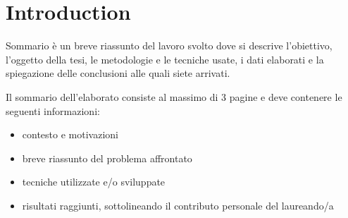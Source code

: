 \documentclass[epsfig,a4paper,11pt,titlepage,twoside,openany]{book}
\begin{document}
      



\chapter{Introduction}
\label{chap:introduction}

Sommario è un breve riassunto del lavoro svolto dove si descrive l'obiettivo,
l'oggetto della tesi, le metodologie e le tecniche usate, i dati elaborati e la
spiegazione delle conclusioni alle quali siete arrivati.

Il sommario dell’elaborato consiste al massimo di 3 pagine e deve contenere le
seguenti informazioni:

\begin{itemize}
\item contesto e motivazioni
\item breve riassunto del problema affrontato
\item tecniche utilizzate e/o sviluppate
\item risultati raggiunti, sottolineando il contributo personale del laureando/a
  
\end{itemize}
\end{document}
